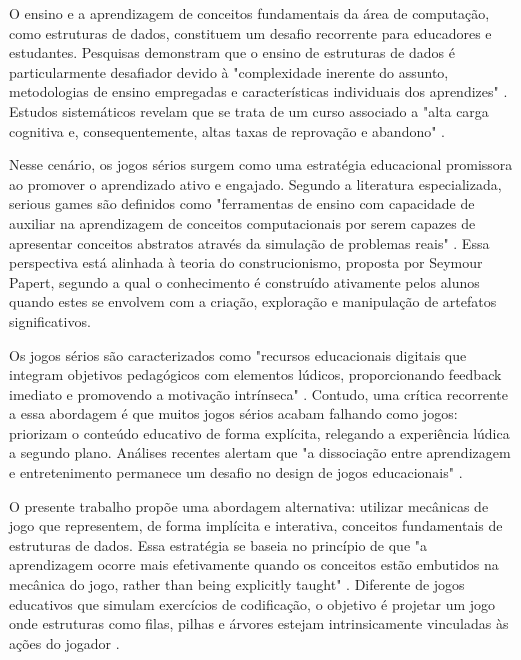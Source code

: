 O ensino e a aprendizagem de conceitos fundamentais da área de computação, como
estruturas de dados, constituem um desafio recorrente para educadores e
estudantes. Pesquisas demonstram que o ensino de estruturas de dados é
particularmente desafiador devido à "complexidade inerente do assunto,
metodologias de ensino empregadas e características individuais dos aprendizes"
\cite{ajol_2024}. Estudos sistemáticos revelam que se trata de um curso
associado a "alta carga cognitiva e, consequentemente, altas taxas de
reprovação e abandono" \cite{ajol_2024}.

Nesse cenário, os jogos sérios surgem como uma estratégia educacional
promissora ao promover o aprendizado ativo e engajado. Segundo a literatura
especializada, serious games são definidos como "ferramentas de ensino com
capacidade de auxiliar na aprendizagem de conceitos computacionais por serem
capazes de apresentar conceitos abstratos através da simulação de problemas
reais" \cite{jose_ifsuldeminas_2024}. Essa perspectiva está alinhada à teoria
do construcionismo, proposta por Seymour Papert, segundo a qual o conhecimento
é construído ativamente pelos alunos quando estes se envolvem com a criação,
exploração e manipulação de artefatos significativos.

Os jogos sérios são caracterizados como "recursos educacionais digitais que
integram objetivos pedagógicos com elementos lúdicos, proporcionando feedback
imediato e promovendo a motivação intrínseca" \cite{scielo_2022}. Contudo, uma
crítica recorrente a essa abordagem é que muitos jogos sérios acabam falhando
como jogos: priorizam o conteúdo educativo de forma explícita, relegando a
experiência lúdica a segundo plano. Análises recentes alertam que "a
dissociação entre aprendizagem e entretenimento permanece um desafio no design
de jogos educacionais" \cite{seer_ufrgs_2024}.

O presente trabalho propõe uma abordagem alternativa: utilizar mecânicas de
jogo que representem, de forma implícita e interativa, conceitos fundamentais
de estruturas de dados. Essa estratégia se baseia no princípio de que "a
aprendizagem ocorre mais efetivamente quando os conceitos estão embutidos na
mecânica do jogo, rather than being explicitly taught"
\cite{jose_ifsuldeminas_2024}. Diferente de jogos educativos que simulam
exercícios de codificação, o objetivo é projetar um jogo onde estruturas como
filas, pilhas e árvores estejam intrinsicamente vinculadas às ações do jogador
\cite{scielo_2022}.

